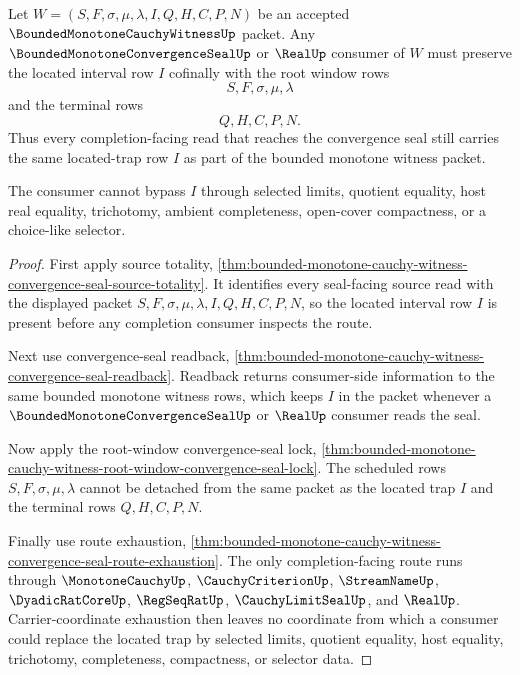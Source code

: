 \begin{theorem}
\label{thm:bounded-monotone-cauchy-witness-located-trap-convergence-seal-cofinality}
Let $W=(S,F,\sigma,\mu,\lambda,I,Q,H,C,P,N)$ be an accepted $\BoundedMonotoneCauchyWitnessUp$ packet. Any $\BoundedMonotoneConvergenceSealUp$ or $\RealUp$ consumer of $W$ must preserve the located interval row $I$ cofinally with the root window rows
$$
S,F,\sigma,\mu,\lambda
$$
and the terminal rows
$$
Q,H,C,P,N.
$$
Thus every completion-facing read that reaches the convergence seal still carries the same located-trap row $I$ as part of the bounded monotone witness packet.

The consumer cannot bypass $I$ through selected limits, quotient equality, host real equality, trichotomy, ambient completeness, open-cover compactness, or a choice-like selector.
\end{theorem}
\begin{proof}
First apply source totality, \autoref{thm:bounded-monotone-cauchy-witness-convergence-seal-source-totality}. It identifies every seal-facing source read with the displayed packet $S,F,\sigma,\mu,\lambda,I,Q,H,C,P,N$, so the located interval row $I$ is present before any completion consumer inspects the route.

Next use convergence-seal readback, \autoref{thm:bounded-monotone-cauchy-witness-convergence-seal-readback}. Readback returns consumer-side information to the same bounded monotone witness rows, which keeps $I$ in the packet whenever a $\BoundedMonotoneConvergenceSealUp$ or $\RealUp$ consumer reads the seal.

Now apply the root-window convergence-seal lock, \autoref{thm:bounded-monotone-cauchy-witness-root-window-convergence-seal-lock}. The scheduled rows $S,F,\sigma,\mu,\lambda$ cannot be detached from the same packet as the located trap $I$ and the terminal rows $Q,H,C,P,N$.

Finally use route exhaustion, \autoref{thm:bounded-monotone-cauchy-witness-convergence-seal-route-exhaustion}. The only completion-facing route runs through $\MonotoneCauchyUp$, $\CauchyCriterionUp$, $\StreamNameUp$, $\DyadicRatCoreUp$, $\RegSeqRatUp$, $\CauchyLimitSealUp$, and $\RealUp$. Carrier-coordinate exhaustion then leaves no coordinate from which a consumer could replace the located trap by selected limits, quotient equality, host equality, trichotomy, completeness, compactness, or selector data.
\end{proof}

